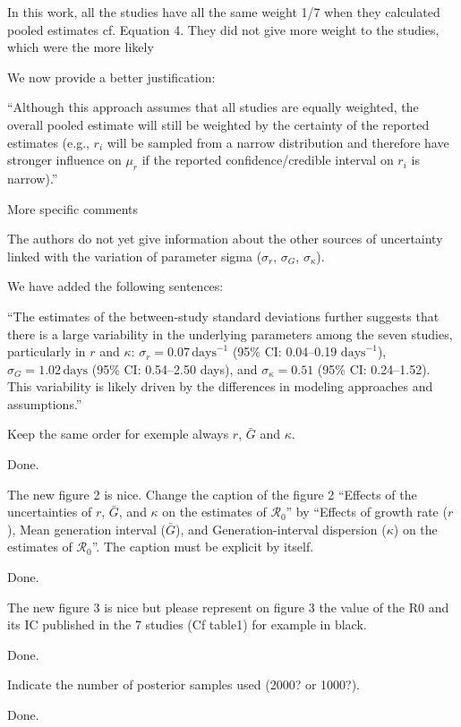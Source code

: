 \documentclass[12pt]{article}
\newcommand{\Ro}{\ensuremath{{\mathcal R}_{0}}\xspace}
\newcommand{\revtext}{\textsf}
\begin{document}
\revtext{In this work, all the studies have all the same weight 1/7 when they calculated pooled estimates
cf. Equation 4. They did not give more weight to the studies, which were the more likely}

We now provide a better justification:

``Although this approach assumes that all studies are equally weighted, the overall pooled estimate will still be weighted by the certainty of the reported estimates (e.g., $r_i$ will be sampled from a narrow distribution and therefore have stronger influence on $\mu_r$ if the reported confidence/credible interval on $r_i$ is narrow).''

\revtext{More specific comments}

\revtext{The authors do not yet give information about the other sources of uncertainty linked
with the variation of parameter sigma ($\sigma_r$, $\sigma_G$, $\sigma_\kappa$).}

We have added the following sentences:

``The estimates of the between-study standard deviations further suggests that there is a large variability in the underlying parameters among the seven studies, particularly in $r$ and $\kappa$:
$\sigma_r = 0.07\,\textrm{days}^{-1}$ (95\% CI: 0.04--0.19 $\textrm{days}^{-1}$),
$\sigma_G = 1.02\,\textrm{days}$ (95\% CI: 0.54--2.50 days),
and
$\sigma_\kappa = 0.51$ (95\% CI: 0.24--1.52).
This variability is likely driven by the differences in modeling approaches and assumptions.''

\revtext{Keep the same order for exemple always $r$, $\bar G$ and $\kappa$.}

Done.

\revtext{
The new figure 2 is nice. Change the caption of the figure 2 “Effects of the uncertainties of $r$, $\bar G$, and $\kappa$ on the estimates of $\Ro$” by “Effects of growth rate ($r$), Mean generation interval ($\bar G$), and Generation-interval dispersion ($\kappa$) on the estimates of $\Ro$”. The caption must be explicit by itself.
}

Done.

\revtext{
The new figure 3 is nice but please represent on figure 3 the value of the R0
and its IC published in the 7 studies (Cf table1) for example in black.
}

Done.

\revtext{
Indicate the number of posterior samples used (2000? or 1000?).
}

Done.
\end{document}
